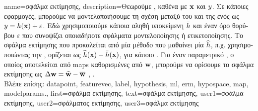 {name={\foreignlanguage{greek}{σφάλμα εκτίμησης}},
	description={\foreignlanguage{greek}{Θεωρούμε} , 
		\foreignlanguage{greek}{καθένα με}  ${\bf x}$ \foreignlanguage{greek}{και}  
		$y$. \foreignlanguage{greek}{Σε κάποιες εφαρμογές, μπορούμε να μοντελοποιήσουμε τη σχέση μεταξύ του}  
		\foreignlanguage{greek}{και της}  \foreignlanguage{greek}{ενός}  \foreignlanguage{greek}{ως} 
		$y = \bar{h}({\bf x}) + \varepsilon$. \foreignlanguage{greek}{Εδώ χρησιμοποιούμε κάποια αληθή υποκείμενη}
		 $\bar{h}$ \foreignlanguage{greek}{και έναν όρο θορύβου $\varepsilon$ 
		που συνοψίζει οποιαδήποτε σφάλματα μοντελοποίησης ή ετικετοποίησης. Το σφάλμα εκτίμησης που προκαλείται από μία μέθοδο} 
		 \foreignlanguage{greek}{που μαθαίνει μία}  $\widehat{h}$, 
		\foreignlanguage{greek}{π.χ. χρησιμοποιώντας την} , \foreignlanguage{greek}{ορίζεται ως  
		$\widehat{h}({\bf x}) - \bar{h}({\bf x})$, για κάποιο} . 
		\foreignlanguage{greek}{Για έναν παραμετρικό} , \foreignlanguage{greek}{ο οποίος αποτελείται από} \gls{map}s
		 \foreignlanguage{greek}{καθορισμένες από}  ${\bf w}$, 
		\foreignlanguage{greek}{μπορούμε να ορίσουμε το σφάλμα εκτίμησης ως} $\Delta {\bf w} = \widehat{{\bf w}} - \overline{{\bf w}}$ 
		\cite{hastie01statisticallearning}, \cite{kay}.\\
		\foreignlanguage{greek}{Βλέπε επίσης:} \gls{datapoint}, \gls{featurevec}, \gls{label}, \gls{hypothesis}, \gls{ml}, \gls{erm}, \gls{hypospace}, 
		\gls{map}, \gls{modelparams}.},
	first={\foreignlanguage{greek}{σφάλμα εκτίμησης}},
	text={\foreignlanguage{greek}{σφάλμα εκτίμησης}},
	user1={\foreignlanguage{greek}{σφάλμα εκτίμησης}}, %
    	user2={\foreignlanguage{greek}{σφάλματος εκτίμησης}}, %
	user3={\foreignlanguage{greek}{σφάλμα εκτίμησης}} %
}

